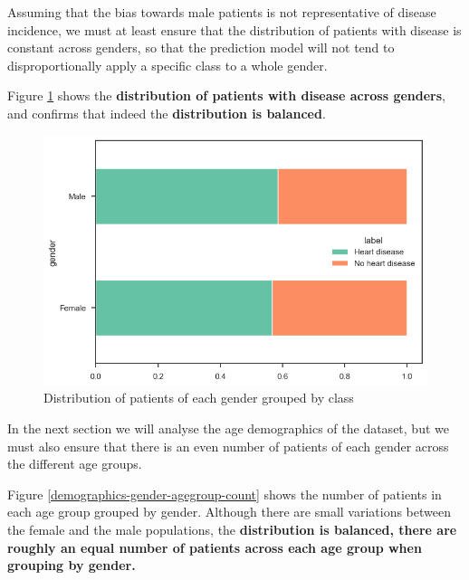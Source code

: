 Assuming that the bias towards male patients is not representative of disease incidence, we must at least
ensure that the distribution of patients with disease is constant across genders, so that the prediction
model will not tend to disproportionally apply a specific class to a whole gender.

Figure \ref{demographics-gender-target-percent} shows the \textbf{distribution of patients with disease across genders},
and confirms that indeed the \textbf{distribution is balanced}.

\begin{figure}[H]
    \caption{Distribution of patients of each gender grouped by class}\label{demographics-gender-target-percent}
    \centering
    \includegraphics[width=\linewidth]{media/demographics-04-gender-target-percentage.png}
\end{figure}

In the next section we will analyse the age demographics of the dataset, but we must also ensure that
there is an even number of patients of each gender across the different age groups. 

Figure \ref{demographics-gender-agegroup-count} shows the number of patients in each age group grouped by
gender. Although there are small variations between the female and the male populations, the
\textbf{distribution is balanced, there are roughly an equal number of patients across each age group when
grouping by gender.}

